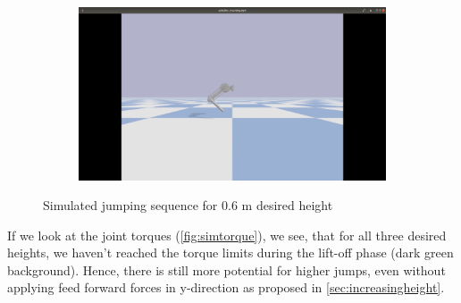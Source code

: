 \documentclass[onecolumn, letter paper]{report}
\begin{document}
\begin{figure}[htb!]
\begin{subfigure}{.24\textwidth}
    \end{subfigure}
    \begin{subfigure}{.24\textwidth}
    \includegraphics[width=\textwidth, trim={25cm 10cm 25cm 5cm}, clip]{figures/sim0.6m/s64.png}
    \end{subfigure}
    \caption{Simulated jumping sequence for 0.6 m desired height}
    \label{fig:simsequence6}
\end{figure}
If we look at the joint torques (\autoref{fig:simtorque}), we see, that for all three desired heights, we haven't reached the torque limits during the lift-off phase (dark green background). Hence, there is still more potential for higher jumps, even without applying feed forward forces in y-direction as proposed in \autoref{sec:increasingheight}.

\end{document}
